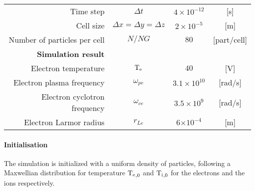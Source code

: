 \begin{table}[htbp]
\begin{tabular}{@{}r c c c@{}}
          Time step & $\Delta t  $                      & $4 \times 10^{-12}$ & [{s}] \\
          Cell size & $\Delta x = \Delta y = \Delta z $ & $2 \times 10^{-5}$  & [{m}] \\
          Number of particles per cell & $N/NG      $                      & $80$                & [{part/cell}] \\
          \midrule
          {\bf Simulation result} &  &  &  \\ 
          Electron temperature & $\mathrm{T_e}$                       & $40$                  & [V] \\
          Electron plasma frequency & $\omega_{pe}$               & $3.1 \times 10^{10} $  & [rad/s]\\
          Electron cyclotron frequency & $\omega_{ce}$               &  $3.5\times 10^{9}$  & [rad/s] \\
          Electron Larmor radius & $r_{Le}$                    & 6$\times 10^{-4}$    & [m] \\
          \bottomrule
       \end{tabular}
    \end{table}
  
  
  \paragraph{Initialisation\\}
  The simulation is initialized with a uniform density of particles, following a Maxwellian distribution for temperature $\mathrm{T_e}_{,0}$ and $\mathrm{T_i}_{,0}$ for the electrons and the ions respectively.
  
  
  